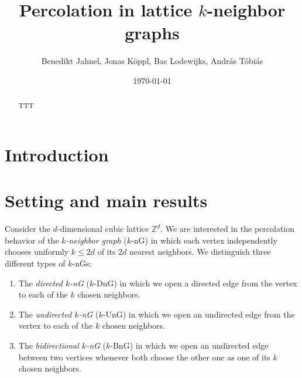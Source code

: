 \documentclass{article}
\title{Percolation in lattice $k$-neighbor graphs}
\author{Benedikt Jahnel, Jonas K\"oppl, Bas Lodewijks, Andr\'as T\'obi\'as}
\date{\today}
\theoremstyle{definition}
\newcommand{\1}{\mathbbm{1}}
\newcommand{\0}{\mathbf{o}}
\begin{document}
\maketitle

\begin{abstract}TTT
\end{abstract}

\section{Introduction}


\section{Setting and main results}\label{sec:set}

Consider the $d$-dimensional cubic lattice $\mathbb Z^d$. We are interested in the percolation behavior of the {\em $k$-neighbor graph} ($k$-nG) in which each vertex independently chooses uniformly $k\le 2d$ of its $2d$ nearest neighbors. We distinguish three different types of $k$-nGs:
\begin{enumerate}
\item The {\em directed $k$-nG} ($k$-DnG) in which we open a directed edge from the vertex to each of the $k$ chosen neighbors. 
\item The {\em undirected $k$-nG} ($k$-UnG) in which we open an undirected edge from the vertex to each of the $k$ chosen neighbors.
\item The {\em bidirectional $k$-nG} ($k$-BnG) in which we open an undirected edge between two vertices whenever both choose the other one as one of its $k$ chosen neighbors.
\end{enumerate}
\end{document}
